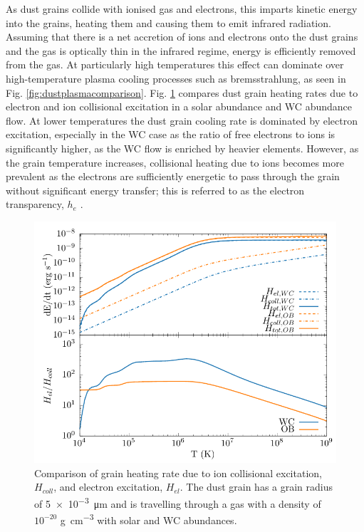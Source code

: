 As dust grains collide with ionised gas and electrons, this imparts kinetic energy into the grains, heating them and causing them to emit infrared radiation. Assuming that there is a net accretion of ions and electrons onto the dust grains and the gas is optically thin in the infrared regime, energy is efficiently removed from the gas.
At particularly high temperatures this effect can dominate over high-temperature plasma cooling processes such as bremsstrahlung, as seen in Fig. \ref{fig:dustplasmacomparison}.
Fig. \ref{fig:collisionalheatingcomparison} compares dust grain heating rates due to electron and ion collisional excitation in a solar abundance and WC abundance flow.
At lower temperatures the dust grain cooling rate is dominated by electron excitation, especially in the WC case as the ratio of free electrons to ions is significantly higher, as the WC flow is enriched by heavier elements.
However, as the grain temperature increases, collisional heating due to ions becomes more prevalent as the electrons are sufficiently energetic to pass through the grain without significant energy transfer; this is referred to as the electron transparency, $h_e$ \parencite{dwek_infrared_1981}.

\begin{figure}[h]
  \centering
  \includegraphics{assets/dust-electron-contribution/coll-el-comp.pdf}
  \caption[$H_{el}$ and $H_{coll}$ comparison]{Comparison of grain heating rate due to ion collisional excitation, $H_{coll}$, and electron excitation, $H_{el}$. The dust grain has a grain radius of \SI{5e-3}{\micro\metre} and is travelling through a gas with a density of $10^{-20}$ \si{\gram\per\centi\metre\cubed} with solar and WC abundances.}
  \label{fig:collisionalheatingcomparison}
\end{figure}

